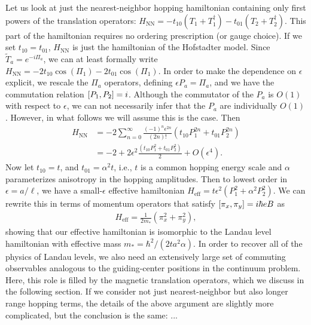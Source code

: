\documentclass[aps,prb,twocolumn,letterpaper,twoside,nobalancelastpage,groupedaddress,amsmath,amssymb,floatfix,citeautoscript]{revtex4-1}
\begin{document}
Let us look at just the nearest-neighbor hopping hamiltonian containing only first powers of the translation operators: $H_{\text{NN}} = -t_{10}\left(T_1 + T_1^{\dag}\right) - t_{01}\left(T_2 + T_2^{\dag}\right)$. This part of the hamiltonian requires no ordering prescription (or gauge choice). If we set $t_{10} = t_{01}$, $H_{\text{NN}}$ is just the hamiltonian of the Hofstadter model. Since $\widetilde{T}_a = e^{-i\Pi_a}$, we can at least formally write $H_{\text{NN}}= -2t_{10}\cos\left(\Pi_1\right) - 2 t_{01}\cos\left(\Pi_1\right).$ In order to make the dependence on $\epsilon$ explicit, we rescale the $\Pi_a$ operators, defining $\epsilon P_a = \Pi_a$, and we have the commutation relation $\comm{P_1}{P_2} = i$. Although the commutator of the $P_a$ is $O(1)$ with respect to $\epsilon$, we can not necessarily infer that the $P_a$ are individually $O(1)$. However, in what follows we will assume this is the case. Then
\begin{align*}
H_{\text{NN}} &= -2\sum_{n=0}^{\infty}  \frac{(-1)^{n}\epsilon^{2n}}{(2n)!} \left(t_{10}P^{2n}_1 + t_{01} P^{2n}_2\right)\\
&= -2 + 2\epsilon^2\frac{\left(t_{10}P^{2}_1 + t_{01}P^{2}_2\right)}{2} +O(\epsilon^4).
\end{align*}
Now let $t_{10} = t$, and $t_{01} = \alpha^2 t$, i.e., $t$ is a common hopping energy scale and $\alpha$ parameterizes anisotropy in the hopping amplitudes. Then to lowest order in $\epsilon = a/\ell$, we have a small-$\epsilon$ effective hamiltonian $H_{\text{eff}}= t\epsilon^2 \left(P^{2}_1 + \alpha^2P^{2}_2\right)$. We can rewrite this in terms of momentum operators that satisfy $\comm{\pi_x}{\pi_y} = i\hbar e B$ as
\begin{align*}
H_{\text{eff}} = \frac{1}{2m_{\ast}}\left(\pi_x^2 + \pi_y^2\right),
\end{align*}
showing that our effective hamiltonian is isomorphic to the Landau level hamiltonian with effective mass $m_{\ast} = \hbar^2/(2ta^2\alpha)$. In order to recover all of the physics of Landau levels, we also need an extensively large set of commuting observables analogous to the guiding-center positions in the continuum problem. Here, this role is filled by the magnetic translation operators, which we discuss in the following section. If we consider not just nearest-neighbor but also longer range hopping terms, the details of the above argument are slightly more complicated, but the conclusion is the same: ...
\end{document}
